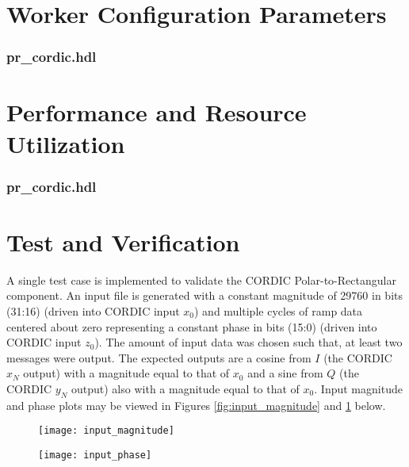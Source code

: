 \documentclass{article}
\def\comp{pr\_cordic}
\edef\ecomp{pr_cordic}
\begin{document}
\begin{landscape}
\section*{Worker Configuration Parameters}
\subsubsection*{\comp.hdl}

\section*{Performance and Resource Utilization}
\subsubsection*{\comp.hdl}

\end{landscape}
\section*{Test and Verification}
\begin{flushleft}
	A single test case is implemented to validate the CORDIC Polar-to-Rectangular component. An input file is generated with a constant magnitude of 29760 in bits (31:16) (driven into CORDIC input $x_0$) and multiple cycles of ramp data centered about zero representing a constant phase in bits (15:0) (driven into CORDIC input $z_0$). The amount of input data was chosen such that, at least two messages were output. The expected outputs are a cosine from $I$ (the CORDIC $x_N$ output) with a magnitude equal to that of $x_0$ and a sine from $Q$ (the CORDIC $y_N$ output) also with a magnitude equal to that of $x_0$. Input magnitude and phase plots may be viewed in Figures \ref{fig:input_magnitude} and \ref{fig:input_phase} below.
\end{flushleft}

	\begin{figure}[ht]
		\centering
		\begin{minipage}{.5\textwidth}
			\centering\texttt{[image: input\_magnitude]}
			\label{fig:input_magnitude}
		\end{minipage}%
		\begin{minipage}{.5\textwidth}
			\centering\texttt{[image: input\_phase]}
			\label{fig:input_phase}
		\end{minipage}
	\end{figure}
\end{document}
